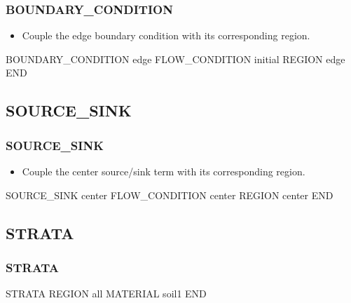 \documentclass{beamer}
\newcommand\greencomment[1]{{{\color{green} #1}}}
\begin{document}
\begin{frame}[fragile]\frametitle{BOUNDARY\_CONDITION}

\begin{itemize}
\item Couple the \greencomment{edge} boundary condition with its corresponding region.
\end{itemize}

\begin{semiverbatim}
BOUNDARY_CONDITION edge
  FLOW_CONDITION initial
  REGION edge
END
\end{semiverbatim}

\end{frame}

\subsection{SOURCE\_SINK}

\begin{frame}[fragile]\frametitle{SOURCE\_SINK}

\begin{itemize}
\item Couple the \greencomment{center} source/sink term with its corresponding region.
\end{itemize}

\begin{semiverbatim}
SOURCE_SINK center
  FLOW_CONDITION center
  REGION center
END
\end{semiverbatim}

\end{frame}


\subsection{STRATA}

\begin{frame}[fragile]\frametitle{STRATA}

\begin{semiverbatim}

STRATA
  REGION all
  MATERIAL soil1
END

\end{semiverbatim}

\end{frame}
\end{document}
